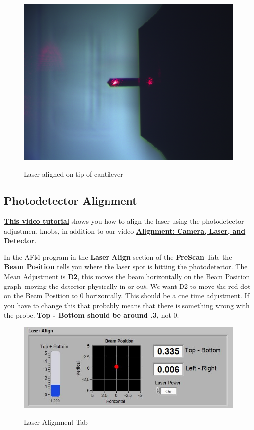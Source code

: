 \documentclass{../lab}
\begin{document}
\begin{enumerate}
\begin{itemize}
        \begin{figure}[H]
        \centering
            \href{http://experimentationlab.berkeley.edu/sites/default/files/AFMImages/laser_align.png}{\includegraphics[width=0.5\linewidth]{images/laser_align.png}}
            \caption{Laser aligned on tip of cantilever}
            \label{LaserAlignment}
        \end{figure}
    \end{itemize}

\end{enumerate}

\subsection{Photodetector Alignment}
\label{subsec:PhotodetectorAlignment}

\href{http://experimentationlab.berkeley.edu/sites/default/files/AFMImages/5.0\%20\%20Phtodetector\%20Alignment\%28V1.0\%29.wmv}{\textbf{This video tutorial}} shows you how to align the laser using the photodetector adjustment knobs, in addition to our video  \href{http://experimentationlab.berkeley.edu/sites/default/files/alignment\_final2.mp4}{\textbf{Alignment: Camera, Laser, and Detector}}.

In the AFM program in the\textbf{ Laser Align} section of the \textbf{PreScan} Tab, the \textbf{Beam Position} tells you where the laser spot is hitting the photodetector. The Mean Adjustment is \textbf{D2}, this moves the beam horizontally on the Beam Position graph--moving the detector physically in or out.  We want D2 to move the red dot on the Beam Position to 0 horizontally.  This should be a one time adjustment.  If you have to change this that probably means that there is something wrong with the probe. \textbf{Top - Bottom should be around .3,} not 0.

\begin{figure}[h]
\centering
    \href{http://experimentationlab.berkeley.edu/sites/default/files/AFMImages/detectoralign.JPG}{\includegraphics[width=0.65\linewidth]{images/detectoralign.JPG}}
    \caption{Laser Alignment Tab}
\end{figure}
\end{document}
